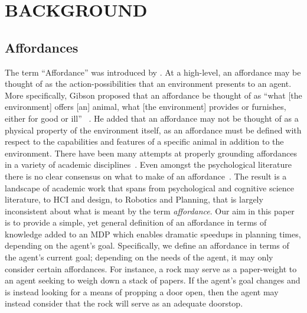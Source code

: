 \documentclass[]{article}
\begin{document}


\section{BACKGROUND}

\subsection{Affordances}

The term ``Affordance'' was introduced by \citet{gibson77}. At a
high-level, an affordance may be thought of as the
action-possibilities that an environment presents to an agent. More
specifically, Gibson proposed that an affordance be thought of as
``what [the environment] offers [an] animal, what [the environment]
provides or furnishes, either for good or ill'' ~\citep{gibson77}. He
added that an affordance may not be thought of as a physical property
of the environment itself, as an affordance must be defined with
respect to the capabilities and features of a specific animal in
addition to the environment.  There have been many attempts at
properly grounding affordances in a variety of academic
disciplines~\citep{koppula13a,harston03,koppula13b,gorniak06,kaschak00}. Even amongst the psychological literature
there is no clear consensus on what to make of an
affordance~\citep{oliver05}.  The result is a landscape of academic
work that spans from psychological and cognitive science literature,
to HCI and design, to Robotics and Planning, that is largely
inconsistent about what is meant by the term {\it affordance}.  Our
aim in this paper is to provide a simple, yet general definition of an
affordance in terms of knowledge added to an MDP which enables
dramatic speedups in planning times, depending on the agent's goal.
Specifically, we define an affordance in terms of the agent's current
goal; depending on the needs of the agent, it may only consider
certain affordances. For instance, a rock may serve as a
paper-weight to an agent seeking to weigh down a stack of papers. If
the agent's goal changes and is instead looking for a means of
propping a door open, then the agent may instead consider that the rock
will serve as an adequate doorstop.
\end{document}
